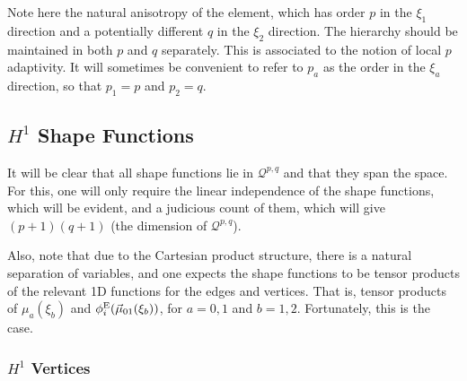 Note here the natural anisotropy of the element, which has order $p$ in the $\xi_1$ direction and a potentially different $q$ in the $\xi_2$ direction. 
The hierarchy should be maintained in both $p$ and $q$ separately. 
This is associated to the notion of local $p$ adaptivity. 
It will sometimes be convenient to refer to $p_a$ as the order in the $\xi_a$ direction, so that $p_1=p$ and $p_2=q$.

\subsection{\texorpdfstring{$H^1$}{H1} Shape Functions}

It will be clear that all shape functions lie in $\mathcal{Q}^{p,q}$ and that they span the space. 
For this, one will only require the linear independence of the shape functions, which will be evident, and a judicious count of them, which will give $(p+1)(q+1)$ (the dimension of $\mathcal{Q}^{p,q}$).

Also, note that due to the Cartesian product structure, there is a natural separation of variables, and one expects the shape functions to be tensor products of the relevant 1D functions for the edges and vertices. 
That is, tensor products of $\mu_a(\xi_b)$ and $\phi_i^{\mathrm{E}}(\vec{\mu}_{01}(\xi_b))$, for $a=0,1$ and $b=1,2$.
Fortunately, this is the case.

\subsubsection{\texorpdfstring{$H^1$}{H1} Vertices}
\label{sec:H1QuadVertices}

